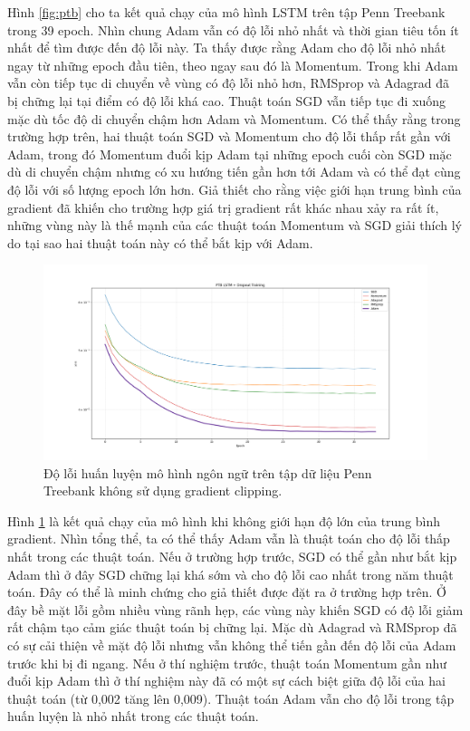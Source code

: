 Hình \ref{fig:ptb} cho ta kết quả chạy của mô hình LSTM trên tập Penn Treebank trong 39 epoch. Nhìn chung Adam vẫn có độ lỗi nhỏ nhất và thời gian tiêu tốn ít nhất để tìm được đến độ lỗi này. Ta thấy được rằng Adam cho độ lỗi nhỏ nhất ngay từ những epoch đầu tiên, theo ngay sau đó là Momentum. Trong khi Adam vẫn còn tiếp tục di chuyển về vùng có độ lỗi nhỏ hơn, RMSprop và Adagrad đã bị chững lại tại điểm có độ lỗi khá cao. Thuật toán SGD vẫn tiếp tục đi xuống mặc dù tốc độ di chuyển chậm hơn Adam và Momentum. Có thể thấy rằng trong trường hợp trên, hai thuật toán SGD và Momentum cho độ lỗi thấp rất gần với Adam, trong đó Momentum đuổi kịp Adam tại những epoch cuối còn SGD mặc dù di chuyển chậm nhưng có xu hướng tiến gần hơn tới Adam và có thể đạt cùng độ lỗi với số lượng epoch lớn hơn. Giả thiết cho rằng việc giới hạn trung bình của gradient đã khiến cho trường hợp giá trị gradient rất khác nhau xảy ra rất ít, những vùng này là thế mạnh của các thuật toán Momentum và SGD giải thích lý do tại sao hai thuật toán này có thể bắt kịp với Adam.

\begin{figure}[htp]
	\centering
	\includegraphics[width=140 mm]{images/ptb2.png}
	\caption{Độ lỗi huấn luyện mô hình ngôn ngữ trên tập dữ liệu Penn Treebank không sử dụng gradient clipping.}
	\label{fig:ptb2}
\end{figure}

Hình \ref{fig:ptb2} là kết quả chạy của mô hình khi không giới hạn độ lớn của trung bình gradient. Nhìn tổng thể, ta có thể thấy Adam vẫn là thuật toán cho độ lỗi thấp nhất trong các thuật toán. Nếu ở trường hợp trước, SGD có thể gần như bắt kịp Adam thì ở đây SGD chững lại khá sớm và cho độ lỗi cao nhất trong năm thuật toán. Đây có thể là minh chứng cho giả thiết được đặt ra ở trường hợp trên. Ở đây bề mặt lỗi gồm nhiều vùng rãnh hẹp, các vùng này khiến SGD có độ lỗi giảm rất chậm tạo cảm giác thuật toán bị chững lại. Mặc dù Adagrad và RMSprop đã có sự cải thiện về mặt độ lỗi nhưng vẫn không thể tiến gần đến độ lỗi của Adam trước khi bị đi ngang. Nếu ở thí nghiệm trước, thuật toán Momentum gần như đuổi kịp Adam thì ở thí nghiệm này đã có một sự cách biệt giữa độ lỗi của hai thuật toán (từ 0,002 tăng lên 0,009). Thuật toán Adam vẫn cho độ lỗi trong tập huấn luyện là nhỏ nhất trong các thuật toán.

